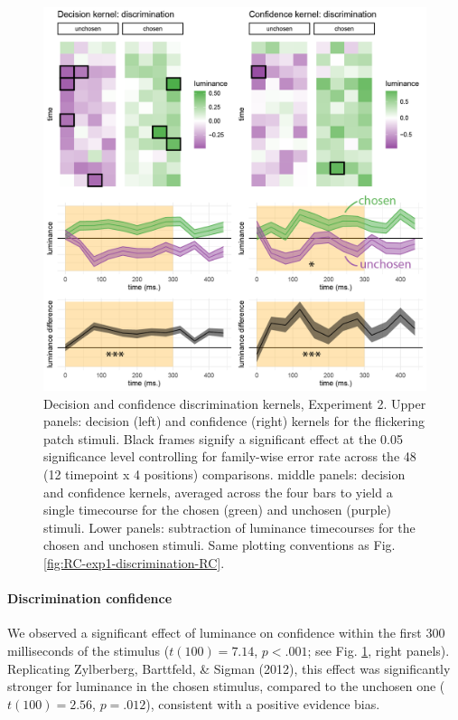 \documentclass[12pt,twoside]{reedthesis}
\begin{document}
\begin{figure}
\includegraphics[width=\textwidth]{figure/RC/RC-exp2-discrimination-RC-enhanced} \caption[Discrimination decision kernels, Exp. 2]{Decision and confidence discrimination kernels, Experiment 2. Upper panels: decision (left) and confidence (right) kernels for the flickering patch stimuli. Black frames signify a significant effect at the 0.05 significance level controlling for family-wise error rate across the 48 (12 timepoint x 4 positions) comparisons. middle panels: decision and confidence kernels, averaged across the four bars to yield a single timecourse for the chosen (green) and unchosen (purple) stimuli. Lower panels: subtraction of luminance timecourses for the chosen and unchosen stimuli. Same plotting conventions as Fig. \ref{fig:RC-exp1-discrimination-RC}.}\label{fig:RC-exp2-discrimination-RC}
\end{figure}
\hypertarget{discrimination-confidence}{%
\paragraph*{Discrimination confidence}\label{discrimination-confidence}}

We observed a significant effect of luminance on confidence within the first 300 milliseconds of the stimulus (\(t(100) = 7.14\), \(p < .001\); see Fig. \ref{fig:RC-exp2-discrimination-RC}, right panels). Replicating Zylberberg, Barttfeld, \& Sigman (2012), this effect was significantly stronger for luminance in the chosen stimulus, compared to the unchosen one (\(t(100) = 2.56\), \(p = .012\)), consistent with a positive evidence bias.
\end{document}

